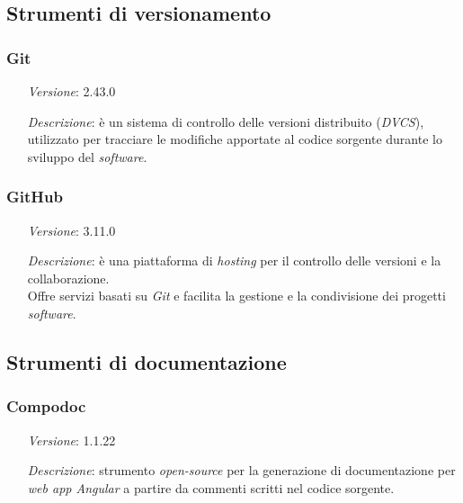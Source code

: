 \subsection{Strumenti di versionamento}
    \subsubsection*{Git}
    \begin{itemize}
        \item [\textit{Versione}:] 2.43.0
        \item [\textit{Descrizione}:] è un sistema di controllo delle versioni distribuito (\textit{DVCS}), utilizzato per tracciare le modifiche apportate al codice sorgente durante lo sviluppo del \textit{software}.
    \end{itemize}

    \subsubsection*{GitHub}
    \begin{itemize}
        \item [\textit{Versione}:] 3.11.0
        \item [\textit{Descrizione}:] è una piattaforma di \textit{hosting} per il controllo delle versioni e la collaborazione. \\
                    Offre servizi basati su \textit{Git} e facilita la gestione e la condivisione dei progetti \textit{software}.
    \end{itemize}

\subsection{Strumenti di documentazione}

\subsubsection*{Compodoc}
\begin{itemize}
    \item [\textit{Versione}:] 1.1.22
    \item [\textit{Descrizione}:] strumento \textit{open-source} per la generazione di documentazione per \textit{web app Angular} a partire da commenti scritti nel codice sorgente.
\end{itemize}

